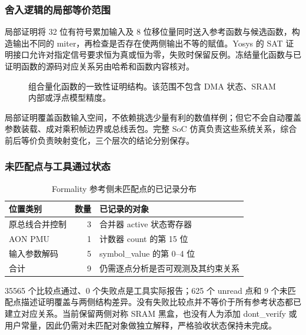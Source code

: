 \subsubsection{舍入逻辑的局部等价范围}
局部证明将 32 位有符号累加输入及 8 位移位量同时送入参考函数与候选函数，构造输出不同的 miter，再检查是否存在使两侧输出不等的赋值。Yosys 的 SAT 证明接口允许对指定信号要求恒为真或恒为零，失败时保留反例\cite{yosys}。冻结量化函数与已证明函数的源码对应关系另由哈希和函数内容核对。

\begin{figure}[H]\centering
{}
\caption{组合量化函数的一致性证明结构。该范围不包含 DMA 状态、SRAM 内部或浮点模型精度。}
\end{figure}

局部证明覆盖函数输入空间，不依赖挑选少量有利的数值样例；但它不会自动覆盖参数装载、成对乘积帧边界或总线丢包。完整 SoC 仿真负责这些系统关系，综合前后等价负责映射变化，三个层次的结论分别保存。

\subsubsection{未匹配点与工具通过状态}
\begin{table}[H]\centering\small
\caption{Formality 参考侧未匹配点的已记录分布}
\begin{tabularx}{\linewidth}{p{49mm}rY}\toprule
位置类别 & 数量 & 已记录的对象\\\midrule
原总线合并控制 & 3 & 合并器 active 状态寄存器\\
AON PMU & 1 & 计数器 count 的第 15 位\\
输入参数解码 & 5 & symbol\_value 的第 0--4 位\\\midrule
合计 & 9 & 仍需逐点分析是否可观测及其约束关系\\\bottomrule
\end{tabularx}
\end{table}

35565 个比较点通过、0 个失败点是工具实际报告；625 个 unread 点和 9 个未匹配点描述证明覆盖与两侧结构差异。没有失败比较点并不等价于所有参考状态都已建立对应关系。当前保留两侧对称 SRAM 黑盒，也没有人为添加 dont\_verify 或用户常量，因此仍需对未匹配对象做独立解释，严格验收状态保持未完成。
